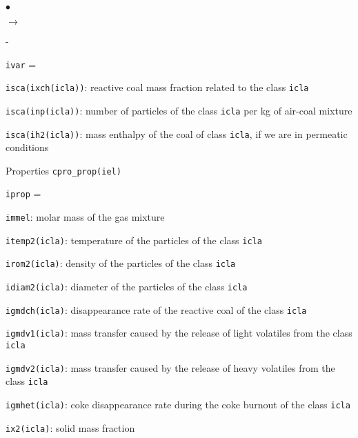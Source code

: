 {{{\begin{list}{$\bullet$}{}
\begin{list}{$\rightarrow$}{}
\begin{list}{}{}
\begin{list}{-}{}
\begin{list}{\texttt{ivar} = }{}
                      \item \texttt{isca(ixch(icla))}: reactive coal
                            mass fraction related to the class \texttt{icla}
                      \item \texttt{isca(inp(icla))}: number of
                            particles of the class \texttt{icla} per kg of
                            air-coal mixture
                      \item \texttt{isca(ih2(icla))}: mass enthalpy
                            of the coal of class \texttt{icla}, if we are in
                            permeatic conditions
                     \end{list}
               \item Properties \texttt{cpro\_prop(iel)}
                     \begin{list}{\texttt{iprop} = }{}
                      \item \texttt{immel}: molar mass of the gas
                            mixture
                      \item \texttt{itemp2(icla)}: temperature of
                            the particles of the class \texttt{icla}
                      \item \texttt{irom2(icla)}: density of
                            the particles of the class \texttt{icla}
                      \item \texttt{idiam2(icla)}: diameter of the
                            particles of the class \texttt{icla}
                      \item \texttt{igmdch(icla)}: disappearance
                            rate of the reactive coal of the class \texttt{icla}
                      \item \texttt{igmdv1(icla)}: mass transfer
                            caused by the release of light volatiles
                            from the class \texttt{icla}
                      \item \texttt{igmdv2(icla)}: mass transfer
                            caused by the release of heavy volatiles
                            from the class \texttt{icla}
                      \item \texttt{igmhet(icla)}: coke
                            disappearance rate during the coke burnout
                            of the class \texttt{icla}
                      \item \texttt{ix2(icla)}: solid mass fraction

\end{list}
\end{list}
\end{list}
\end{list}
\end{list}}}}

